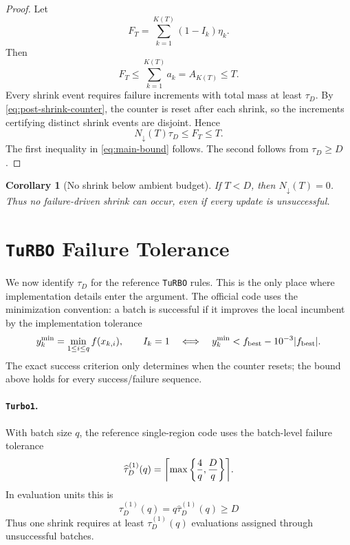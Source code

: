 \documentclass[10pt]{article}
\numberwithin{equation}{section}
\newcommand{\TuRBO}{\textnormal{\texttt{TuRBO}}}
\newcommand{\TurboOne}{\textnormal{\texttt{Turbo1}}}
\newcommand{\best}{f_{\mathrm{best}}}
\DeclarePairedDelimiter{\abs}{\lvert}{\rvert}
\DeclarePairedDelimiter{\ceil}{\lceil}{\rceil}
\theoremstyle{plain}
\newtheorem{corollary}{Corollary}
\theoremstyle{definition}
\theoremstyle{remark}
\begin{document}
\begin{proof}
Let
\[
  F_T=\sum_{k=1}^{K(T)}(1-I_k)\eta_k .
\]
Then
\[
  F_T
  \le
  \sum_{k=1}^{K(T)}a_k
  =
  A_{K(T)}
  \le
  T .
\]
Every shrink event requires failure increments with total mass at least
\(\tau_D\).  By \eqref{eq:post-shrink-counter}, the counter is reset after each
shrink, so the increments certifying distinct shrink events are disjoint.  Hence
\[
  N_{\downarrow}(T)\tau_D\le F_T\le T.
\]
The first inequality in \eqref{eq:main-bound} follows.  The second follows from
\(\tau_D\ge D\).
\end{proof}

\begin{corollary}[No shrink below ambient budget]
If \(T<D\), then \(N_{\downarrow}(T)=0\).  Thus no failure-driven shrink
can occur, even if every update is unsuccessful.
\end{corollary}

\section{\TuRBO{} Failure Tolerance}

We now identify \(\tau_D\) for the reference \TuRBO{} rules.  This is the only
place where implementation details enter the argument.  The official code uses
the minimization convention: a batch is successful if it improves the local
incumbent by the implementation tolerance
\begin{equation}
  y_k^{\min}=\min_{1\le i\le q} f(x_{k,i}),
  \qquad
  I_k=1
  \quad\Longleftrightarrow\quad
  y_k^{\min}
  <
  \best
  -
  10^{-3}\abs{\best}.
  \label{eq:success}
\end{equation}
The exact success criterion only determines when the counter resets; the bound
above holds for every success/failure sequence.

\paragraph{\TurboOne.}
With batch size \(q\), the reference single-region code uses the batch-level
failure tolerance \cite{turboOne}
\begin{equation}
  \widehat{\tau}^{(1)}_D(q)
  =
  \ceil*{
    \max\left\{\frac{4}{q},\frac{D}{q}\right\}
  } .
  \label{eq:turbo-one-failure-tolerance}
\end{equation}
In evaluation units this is
\begin{equation}
  \tau_D^{(1)}(q)
  =
  q\widehat{\tau}^{(1)}_D(q)
  \ge D
  \label{eq:turbo-one-evaluation-threshold}
\end{equation}
Thus one shrink requires at least \(\tau_D^{(1)}(q)\) evaluations assigned
through unsuccessful batches.
\end{document}
